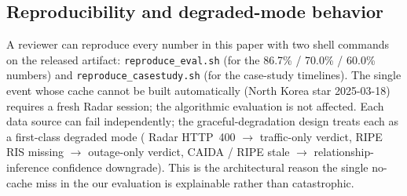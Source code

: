 \subsection{Reproducibility and degraded-mode behavior}
\label{sec:reproducibility}

A reviewer can reproduce every number in this paper with
two shell commands on the released artifact:
\texttt{reproduce\_eval.sh} (for the 86.7\% / 70.0\% /
60.0\% numbers) and \texttt{reproduce\_casestudy.sh}
(for the case-study timelines). The single
event whose cache cannot be built automatically
(North Korea star 2025-03-18) requires a
fresh \cf{} Radar session; the algorithmic evaluation is
not affected. Each data source can fail independently;
the graceful-degradation design treats each as a
first-class degraded mode (\cf{} Radar HTTP~400 $\to$
traffic-only verdict, RIPE RIS missing $\to$
outage-only verdict, CAIDA / RIPE stale $\to$
relationship-inference confidence downgrade). This is
the architectural reason the single no-cache miss in the
our evaluation is explainable rather than catastrophic.
